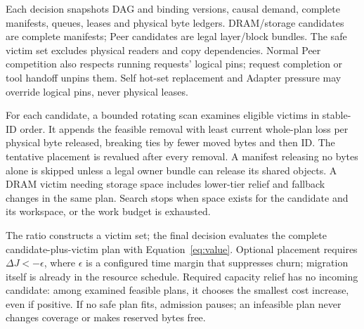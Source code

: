 Each decision snapshots DAG and binding versions, causal demand, complete
manifests, queues, leases and physical byte ledgers. DRAM/storage candidates
are complete manifests; Peer candidates are legal layer/block bundles.
The safe victim set excludes physical readers and copy dependencies.
Normal Peer competition also respects running requests' logical pins;
request completion or tool handoff unpins them. Self hot-set replacement
and Adapter pressure may override logical pins, never physical leases.

For each candidate, a bounded rotating scan examines eligible victims
in stable-ID order. It appends the feasible removal with least current
whole-plan loss per physical byte released, breaking ties by fewer moved
bytes and then ID. The tentative placement is revalued after every
removal. A manifest releasing no bytes alone is skipped unless a legal
owner bundle can release its shared objects. A DRAM victim needing
storage space includes lower-tier relief and fallback changes in the
same plan. Search stops when space exists for the candidate and its
workspace, or the work budget is exhausted.

The ratio constructs a victim set; the final decision evaluates the
complete candidate-plus-victim plan with Equation~\ref{eq:value}.
Optional placement requires $\Delta J<-\epsilon$, where $\epsilon$ is a
configured time margin that suppresses churn; migration itself is already
in the resource schedule. Required capacity relief has no incoming
candidate: among examined feasible plans, it chooses the smallest cost
increase, even if positive. If no safe plan fits, admission pauses;
an infeasible plan never changes coverage or makes reserved bytes free.

